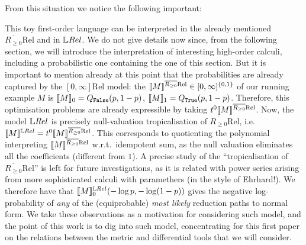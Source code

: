 From this situation we notice the following important:

\begin{remark}\label{rmk:tropof01Rel}
This toy first-order language can be interpreted in the already mentioned $\overline{R_{\geq 0}}\mathrm{Rel}$ and in $\LREL$.
We do not give details now since, from the following section, we will introduce the interpretation of interesting high-order calculi, including a probabilistic one containing the one of this section.
But it is important to mention already at this point that the probabilities are already captured by the $[0,\infty]\mathrm{Rel}$ model: the $\llbracket M\rrbracket^{\overline{R_{\geq 0}}\mathrm{Rel}}\in[0,\infty]^{\{0,1\}}$ of our running example $M$ is $\llbracket M\rrbracket_0=Q_{\mathtt{False}}(p,1-p)$, $\llbracket M\rrbracket_1=Q_{\mathtt{True}}(p,1-p)$.
Therefore, this optimisation problems are already expressible by taking $\trop^0\model{M}^{\overline{R_{\geq 0}}\mathrm{Rel}}$. 
Now, the model $\LREL$ is precisely null-valuation tropicalisation of $\overline{R_{\geq 0}}\mathrm{Rel}$, i.e.\ $\model{M}^{\LREL}=\trop^0\model{M}^{\overline{R_{\geq 0}}\mathrm{Rel}}$.
This corresponds to quotienting the polynomial interpreting $\llbracket M\rrbracket^{\overline{R_{\geq 0}}\mathrm{Rel}}$ w.r.t.\ idempotent sum, as the null valuation eliminates all the coefficients (different from $1$).
A precise study of the ``tropicalisation of $\overline{R_{\geq 0}}\mathrm{Rel}$'' is left for future investigations, as it is related with power series arising from more sophisticated calculi with paramethers (in the style of \cite{} {\color{red}Ehrhard!}).
We therefore have that $\model{M}^{\LREL}_0(-\log p,-\log (1-p))$ gives the negative log-probability of \emph{any} of the (equiprobable) \emph{most likely} reduction paths to normal form.
We take these observations as a motivation for considering such model, and the point of this work is to dig into such model, concentrating for this first paper on the relations between the metric and differential tools that we will consider.
\end{remark}

